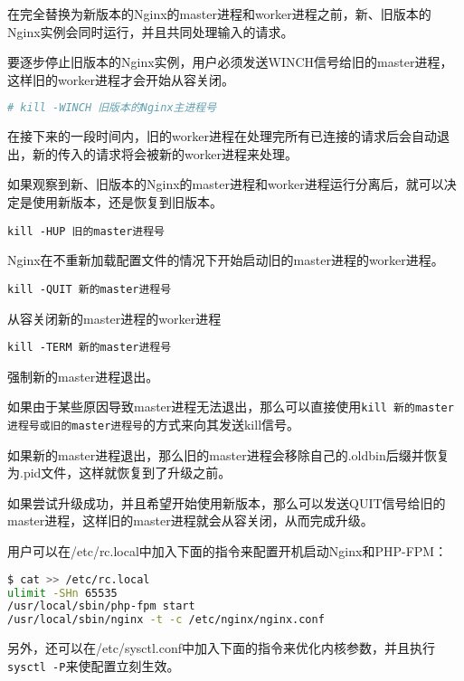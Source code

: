 在完全替换为新版本的Nginx的master进程和worker进程之前，新、旧版本的Nginx实例会同时运行，并且共同处理输入的请求。

要逐步停止旧版本的Nginx实例，用户必须发送WINCH信号给旧的master进程，这样旧的worker进程才会开始从容关闭。

\begin{lstlisting}[language=bash]
# kill -WINCH 旧版本的Nginx主进程号
\end{lstlisting}

在接下来的一段时间内，旧的worker进程在处理完所有已连接的请求后会自动退出，新的传入的请求将会被新的worker进程来处理。


如果观察到新、旧版本的Nginx的master进程和worker进程运行分离后，就可以决定是使用新版本，还是恢复到旧版本。

\begin{compactitem}
\item \texttt{kill -HUP 旧的master进程号}

Nginx在不重新加载配置文件的情况下开始启动旧的master进程的worker进程。


\item \texttt{kill -QUIT 新的master进程号}

从容关闭新的master进程的worker进程


\item \texttt{kill -TERM 新的master进程号}

强制新的master进程退出。
\end{compactitem}

如果由于某些原因导致master进程无法退出，那么可以直接使用\texttt{kill~新的master进程号或旧的master进程号}的方式来向其发送kill信号。


如果新的master进程退出，那么旧的master进程会移除自己的.oldbin后缀并恢复为.pid文件，这样就恢复到了升级之前。

如果尝试升级成功，并且希望开始使用新版本，那么可以发送QUIT信号给旧的master进程，这样旧的master进程就会从容关闭，从而完成升级。

用户可以在/etc/rc.local中加入下面的指令来配置开机启动Nginx和PHP-FPM：


\begin{lstlisting}[language=bash]
$ cat >> /etc/rc.local
ulimit -SHn 65535
/usr/local/sbin/php-fpm start
/usr/local/sbin/nginx -t -c /etc/nginx/nginx.conf
\end{lstlisting}


另外，还可以在/etc/sysctl.conf中加入下面的指令来优化内核参数，并且执行\texttt{sysctl -P}来使配置立刻生效。


